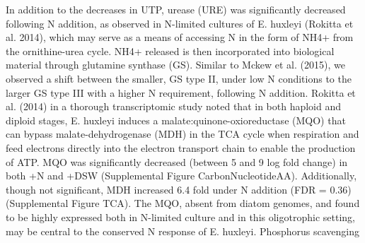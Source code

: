 In addition to the decreases in UTP, urease (URE) was significantly decreased following N addition, as observed in N-limited cultures of E. huxleyi (Rokitta et al. 2014), which may serve as a means of accessing N in the form of NH4+ from the ornithine-urea cycle. NH4+ released is then incorporated into biological material through glutamine synthase (GS). Similar to Mckew et al. (2015), we observed a shift between the smaller, GS type II, under low N conditions to the larger GS type III with a higher N requirement, following N addition. Rokitta et al. (2014) in a thorough transcriptomic study noted that in both haploid and diploid stages, E. huxleyi induces a malate:quinone-oxioreductase (MQO) that can bypass malate-dehydrogenase (MDH) in the TCA cycle when respiration and feed electrons directly into the electron transport chain to enable the production of ATP. MQO was significantly decreased (between 5 and 9 log fold change) in both +N and +DSW (Supplemental Figure CarbonNucleotideAA). Additionally, though not significant, MDH increased 6.4 fold under N addition (FDR = 0.36) (Supplemental Figure TCA). The MQO, absent from diatom genomes, and found to be highly expressed both in N-limited culture and in this oligotrophic setting, may be central to the conserved N response of E. huxleyi. 
Phosphorus scavenging 
